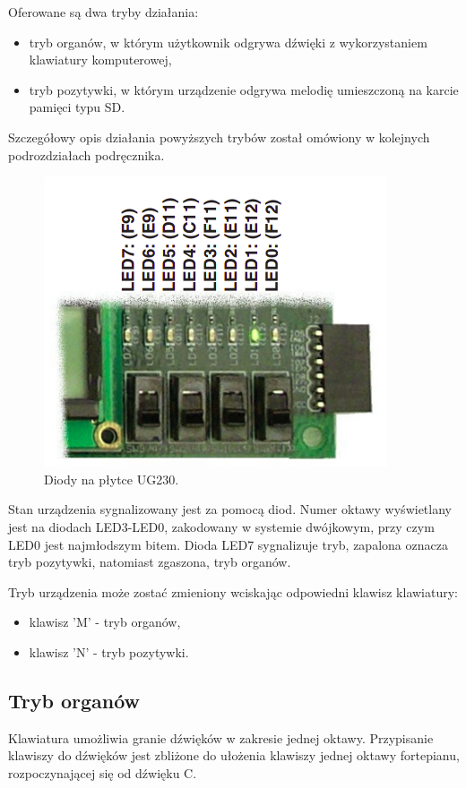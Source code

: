 \documentclass[a4paper,12pt]{article}
\begin{document}
Oferowane są dwa tryby działania: 
\begin{itemize}
  \item tryb organów, w którym użytkownik odgrywa dźwięki z wykorzystaniem klawiatury komputerowej,
  \item tryb pozytywki, w którym urządzenie odgrywa melodię umieszczoną na karcie pamięci typu SD.
\end{itemize}
 
Szczegółowy opis działania powyższych trybów został omówiony w kolejnych podrozdziałach podręcznika.

\begin{figure}[h]
  \centering
  \includegraphics[width=0.6\linewidth]{images/discrete_leds.png}
  \caption{Diody na płytce UG230\cite{web:ug230}.}
  \label{led_mapping}
\end{figure}

Stan urządzenia sygnalizowany jest za pomocą diod. Numer oktawy wyświetlany jest na diodach LED3-LED0, zakodowany w systemie dwójkowym, przy czym LED0 jest najmłodszym bitem. Dioda LED7 sygnalizuje tryb, zapalona oznacza tryb pozytywki, natomiast zgaszona, tryb organów. 

Tryb urządzenia może zostać zmieniony wciskając odpowiedni klawisz klawiatury:
\begin{itemize}
  \item klawisz 'M' - tryb organów,
  \item klawisz 'N' - tryb pozytywki.
\end{itemize}

\subsection{Tryb organów}

Klawiatura umożliwia granie dźwięków w zakresie jednej oktawy. 
Przypisanie klawiszy do dźwięków jest zbliżone do ułożenia klawiszy jednej oktawy fortepianu, rozpoczynającej się od dźwięku C.
\end{document}
